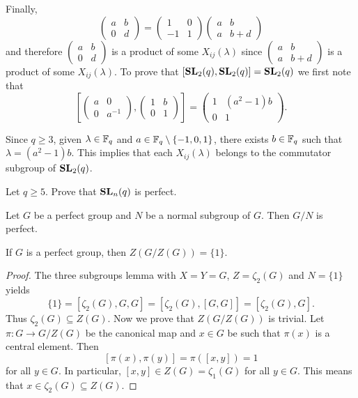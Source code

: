 Finally, 
\[
\begin{pmatrix}
	a&b\\
	0&d
\end{pmatrix}
=\begin{pmatrix}
	1&0\\
	-1&1
\end{pmatrix}
\begin{pmatrix}
	a&b\\
	a&b+d
\end{pmatrix}
\]
and therefore $\begin{pmatrix}
	a&b\\
	0&d
\end{pmatrix}$ is a product of some $X_{ij}(\lambda)$ since
$\begin{pmatrix}
a&b\\
a&b+d	
\end{pmatrix}$ 
is a product of some $X_{ij}(\lambda)$. 
To prove that $[\mathbf{SL}_2(q),\mathbf{SL}_2(q)]=\mathbf{SL}_2(q)$ we first 
note that
\[
\left[\begin{pmatrix}a&0\\0&a^{-1}\end{pmatrix},\begin{pmatrix}1&b\\0&1\end{pmatrix}\right]
=\begin{pmatrix}
1 & (a^2-1)b\\
0 & 1
\end{pmatrix}.
\]	

Since $q\geq 3$, given $\lambda\in\mathbb{F}_q$ and $a\in\mathbb{F}_q\setminus\{-1,0,1\}$, there exists
$b\in\mathbb{F}_q$ such that $\lambda=(a^2-1)b$. This implies that each $X_{ij}(\lambda)$ belongs to the
commutator subgroup of $\mathbf{SL}_2(q)$. 


\begin{exercise}
Let $q\geq5$. 
Prove that $\mathbf{SL}_n(q)$ is perfect.  	
\end{exercise}


\begin{exercise}
Let $G$ be a perfect group and $N$ be a normal subgroup of $G$. Then $G/N$ is perfect.  	
\end{exercise}

\begin{theorem}[Gr\"un]
	\label{theorem:Grun}
	If $G$ is a perfect group, then $Z(G/Z(G))=\{1\}$. 
\end{theorem}

\begin{proof}
	The three subgroups lemma with $X=Y=G$, $Z=\zeta_2(G)$ and $N=\{1\}$ yields  
	\[
	\{1\}=[\zeta_2(G),G,G]=[\zeta_2(G),[G,G]]=[\zeta_2(G),G].
	\]
	Thus 	
	$\zeta_2(G)\subseteq Z(G)$. Now we prove that $Z(G/Z(G))$ is trivial. Let $\pi\colon G\to G/Z(G)$ be the canonical map
	and $x\in G$ be such that 
	$\pi(x)$ is a central element. Then 
	\[
	[\pi(x),\pi(y)]=\pi([x,y])=1
	\]
	for all $y\in G$. In particular, 
	$[x,y]\in Z(G)=\zeta_1(G)$ for all $y\in G$. This means that $x\in\zeta_2(G)\subseteq Z(G)$. 
\end{proof}

